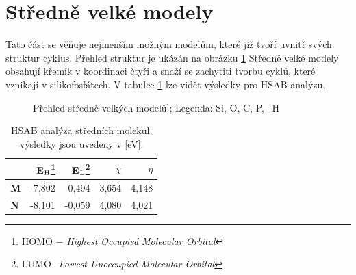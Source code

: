\documentclass[
digital, %
table,   %
lof,     %
lot,     %
oneside,
]{fithesis3}
\begin{document}
\section{Středně velké modely}
Tato část se věňuje nejmenším možným modelům, které již tvoří uvnitř svých struktur cyklus. Přehled struktur je ukázán na obrázku \ref{prehled_middle} Středně velké modely obsahují křemík v koordinaci čtyři a snaží se zachytiti tvorbu cyklů, které vznikají v silikofosfátech. V tabulce \ref{hsab_middle} lze vidět výsledky pro HSAB analýzu.
\begin{figure}
\begin{center}
\caption{Přehled středně velkých modelů];  Legenda:  Si,  O,  C,  P, ~H}
\label{prehled_middle}
\end{center}
\end{figure}

\begin{table}[htbp]
\begin{minipage}{\textwidth}
\caption{HSAB analýza středních molekul, výsledky jsou uvedeny v [eV].}
\begin{center}
\begin{tabular}{|l|r|r|r|r|}
\hline
\label{hsab_middle}& E$_{\ce{H}}$\footnote{HOMO $-$ \textit{Highest Occupied Molecular Orbital}}  & E$_{\ce{L}}$\footnote{LUMO$ - $\textit{Lowest Unoccupied Molecular Orbital}} & $\chi$  & $\eta$ \\ \hline
\textbf{M} & -7,802 & 0,494 & 3,654 & 4,148 \\ \hline
\textbf{N} & -8,101 & -0,059 & 4,080 & 4,021 \\ \hline
\end{tabular}
\end{center}
\end{minipage}
\end{table}
\end{document}
